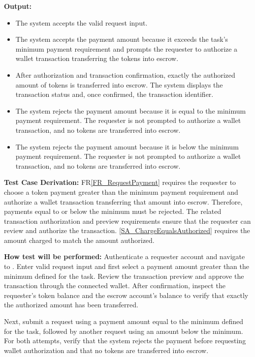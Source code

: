 \documentclass[12pt]{article}
\newcommand{\rref}[1]{FR\ref{#1}}
\newcommand{\saref}[1]{\ref{#1}}
\newcommand{\fixture}[1]{\texttt{\seqsplit{#1}}}
\begin{document}
\begin{enumerate}
\textbf{Output:}
\begin{itemize}
\item[1.] The system accepts the valid request input.
\item[2.] The system accepts the payment amount because it exceeds the task's
minimum payment requirement and prompts the requester to authorize a wallet
transaction transferring the tokens into escrow.
\item[3.] After authorization and transaction confirmation, exactly the
authorized amount of tokens is transferred into escrow. The system displays
the transaction status and, once confirmed, the transaction identifier.
\item[4.] The system rejects the payment amount because it is equal to the
minimum payment requirement. The requester is not prompted to authorize a
wallet transaction, and no tokens are transferred into escrow.
\item[5.] The system rejects the payment amount because it is below the
minimum payment requirement. The requester is not prompted to authorize a
wallet transaction, and no tokens are transferred into escrow.
\end{itemize}

\textbf{Test Case Derivation:} \rref{FR_RequestPayment} requires the requester to choose
a token payment greater than the minimum payment requirement and authorize
a wallet transaction transferring that amount into escrow. Therefore, payments
equal to or below the minimum must be rejected. The related transaction
authorization and preview requirements ensure that the requester can review
and authorize the transaction. \saref{SA_ChargeEqualsAuthorized} requires the
amount charged to match the amount authorized.

\textbf{How test will be performed:} Authenticate a requester account and navigate
to \fixture{TASK-03}. Enter valid request input and first select a payment amount
greater than the minimum defined for the task. Review the transaction preview
and approve the transaction through the connected wallet. After confirmation,
inspect the requester's token balance and the escrow account's balance to verify
that exactly the authorized amount has been transferred.

Next, submit a request using a payment amount equal to the minimum defined for the task, followed by another request using an amount
below the minimum. For both attempts, verify that the system rejects the payment
before requesting wallet authorization and that no tokens are transferred into
escrow.

\end{enumerate}
\end{document}
